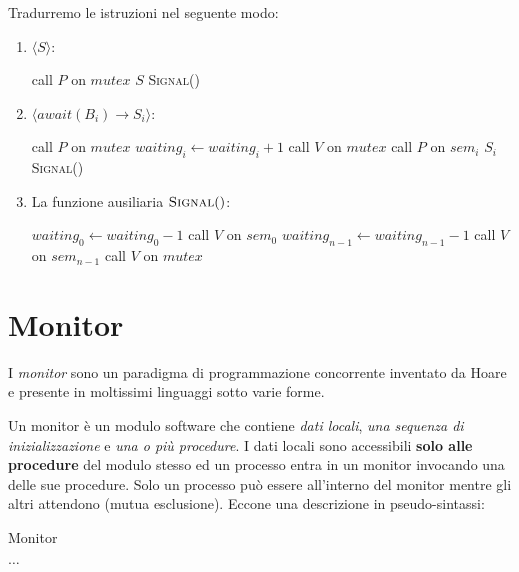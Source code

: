 \documentclass{article}
\begin{document}
Tradurremo le istruzioni nel seguente modo:
\begin{enumerate}
  \item $\langle S \rangle$:
    \begin{algorithmic}[0]
      \State call $P$ on $mutex$
      \State $S$
      \State \textsc{Signal}()
    \end{algorithmic}
  \item $\langle await(B_i) \rightarrow S_i \rangle$:
    \begin{algorithmic}[0]
      \State call $P$ on $mutex$
        \State $waiting_i \gets waiting_i + 1$
        \State call $V$ on $mutex$
        \State call $P$ on $sem_i$
      \EndIf
      \State $S_i$
      \State \textsc{Signal}()
    \end{algorithmic}
  \item La funzione ausiliaria $\textsc{Signal}()$:
    \begin{algorithmic}[0]
        \State $waiting_0 \gets waiting_0 - 1$
        \State call $V$ on $sem_0$
      \ElsIf{$\ldots$}
        \State $waiting_{n-1} \gets waiting_{n-1} - 1$
        \State call $V$ on $sem_{n-1}$
        \State call $V$ on $mutex$
      \EndIf
    \end{algorithmic}
\end{enumerate}

\section{Monitor}

I \emph{monitor} sono un paradigma di programmazione concorrente inventato da
Hoare e presente in moltissimi linguaggi sotto varie forme.

Un monitor \`e un modulo software che contiene \emph{dati locali}, \emph{una
sequenza di inizializzazione} e \emph{una o pi\`u procedure}.
I dati locali sono accessibili \textbf{solo alle procedure} del modulo stesso ed
un processo entra in un monitor invocando una delle sue procedure. Solo un
processo pu\`o essere all'interno del monitor mentre gli altri attendono
(mutua esclusione). Eccone una descrizione in pseudo-sintassi:

\begin{algorithm}[H]
  \caption{Monitor}
  \begin{algorithmic}[0]
    \State $\ldots$

    \State
    \EndProcedure

    \State
    \EndProcedureEntry

    \State
    \EndProcedure

    \EndMonitor
  \end{algorithmic}
\end{algorithm}
\end{document}

